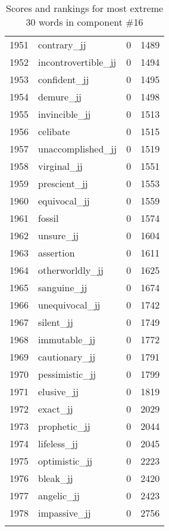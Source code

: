 \begin{longtable}[!htbp]{| rlr@{.}l |}
    1951 & contrary\_jj & 0 & 1489 \\
    1952 & incontrovertible\_jj & 0 & 1494 \\
    1953 & confident\_jj & 0 & 1495 \\
    1954 & demure\_jj & 0 & 1498 \\
    1955 & invincible\_jj & 0 & 1513 \\
    1956 & celibate & 0 & 1515 \\
    1957 & unaccomplished\_jj & 0 & 1519 \\
    1958 & virginal\_jj & 0 & 1551 \\
    1959 & prescient\_jj & 0 & 1553 \\
    1960 & equivocal\_jj & 0 & 1559 \\
    1961 & fossil & 0 & 1574 \\
    1962 & unsure\_jj & 0 & 1604 \\
    1963 & assertion & 0 & 1611 \\
    1964 & otherworldly\_jj & 0 & 1625 \\
    1965 & sanguine\_jj & 0 & 1674 \\
    1966 & unequivocal\_jj & 0 & 1742 \\
    1967 & silent\_jj & 0 & 1749 \\
    1968 & immutable\_jj & 0 & 1772 \\
    1969 & cautionary\_jj & 0 & 1791 \\
    1970 & pessimistic\_jj & 0 & 1799 \\
    1971 & elusive\_jj & 0 & 1819 \\
    1972 & exact\_jj & 0 & 2029 \\
    1973 & prophetic\_jj & 0 & 2044 \\
    1974 & lifeless\_jj & 0 & 2045 \\
    1975 & optimistic\_jj & 0 & 2223 \\
    1976 & bleak\_jj & 0 & 2420 \\
    1977 & angelic\_jj & 0 & 2423 \\
    1978 & impassive\_jj & 0 & 2756 \\
    \hline
    \caption{Scores and rankings for most extreme 30 words in component \#16} \\
\end{longtable}
